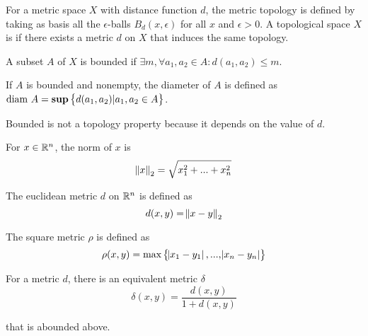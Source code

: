 \begin{definition}
    For a metric space $X$ with distance function $d$, the metric topology is defined by taking as basis all the $\epsilon$-balls $B_d(x,\epsilon)$ for all $x$ and $\epsilon > 0$. A topological space $X$ is  if there exists a metric $d$ on $X$ that induces the same topology.
\end{definition}

\begin{definition}
    A subset $A$ of $X$ is bounded if $\exists m, \forall a_1, a_2 \in A: d(a_1, a_2) \leq m$. 
\end{definition}

\begin{definition}
    If $A$ is bounded and nonempty, the diameter of $A$ is defined as $\text{diam } A = \mathbf{sup} \set{d(a_1, a_2)| a_1, a_2 \in A}$.
    
    Bounded is not a topology property because it depends on the value of $d$.
\end{definition}


\begin{definition}
    For $x \in \mathbb{R}^n$, the norm of $x$ is 
    \begin{equation}
        \norm{x}_2 = \sqrt{x_1^2 + ... + x_n^2}
    \end{equation}
\end{definition}

\begin{definition}
    The euclidean metric \emph{$d$} on $\mathbb{R}^n$ is defined as
    \begin{equation}
        d(x,y) = \norm{x - y}_2
    \end{equation}
\end{definition}

\begin{definition}
    The square metric \emph{$\rho$} is defined as
    \begin{equation}
        \rho (x,y) = \text{max}\set{\abs{x_1 - y_1}, ... , \abs{x_n - y_n} }
    \end{equation}
\end{definition}

\begin{theorem}
    For a metric $d$, there is an equivalent metric $\delta$
    \begin{equation}
        \delta (x,y) = \frac{d(x,y)}{1+d(x,y)}
    \end{equation}    
    
    that is abounded above.
\end{theorem}


